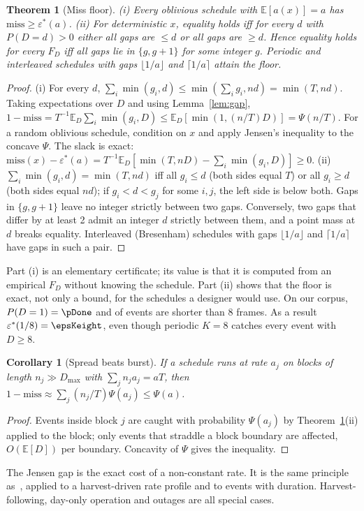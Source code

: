 \documentclass[final,5p,times,twocolumn]{elsarticle}
\newtheorem{theorem}{Theorem}
\newtheorem{corollary}{Corollary}
\theoremstyle{definition}
\theoremstyle{remark}
\newcommand{\eps}{\varepsilon}
\newcommand{\Psif}{\Psi}
\newcommand{\E}{\mathbb{E}}
\begin{document}
\begin{theorem}[Miss floor]\label{thm:floor}
(i) Every oblivious schedule with $\E[a(x)]=a$ has $\mathrm{miss}\ge\eps^*(a)$.
(ii) For deterministic $x$, equality holds iff for every $d$ with $P(D=d)>0$ either all gaps are $\le d$ or all gaps are $\ge d$. Hence equality holds for every $F_D$ iff all gaps lie in $\{g,g+1\}$ for some integer $g$. Periodic and interleaved schedules with gaps $\lfloor1/a\rfloor$ and $\lceil1/a\rceil$ attain the floor.
\end{theorem}
\begin{proof}
(i) For every $d$, $\sum_i\min(g_i,d)\le\min(\sum_ig_i,nd)=\min(T,nd)$. Taking expectations over $D$ and using Lemma~\ref{lem:gap}, $1-\mathrm{miss}=T^{-1}\E_D\sum_i\min(g_i,D)\le\E_D[\min(1,(n/T)D)]=\Psif(n/T)$. For a random oblivious schedule, condition on $x$ and apply Jensen's inequality to the concave $\Psif$. The slack is exact: $\mathrm{miss}(x)-\eps^*(a)=T^{-1}\E_D[\min(T,nD)-\sum_i\min(g_i,D)]\ge0$.
(ii) $\sum_i\min(g_i,d)=\min(T,nd)$ iff all $g_i\le d$ (both sides equal $T$) or all $g_i\ge d$ (both sides equal $nd$); if $g_i<d<g_j$ for some $i,j$, the left side is below both. Gaps in $\{g,g+1\}$ leave no integer strictly between two gaps. Conversely, two gaps that differ by at least 2 admit an integer $d$ strictly between them, and a point mass at $d$ breaks equality. Interleaved (Bresenham) schedules with gaps $\lfloor1/a\rfloor$ and $\lceil1/a\rceil$ have gaps in such a pair.
\end{proof}
\noindent Part (i) is an elementary certificate; its value is that it is computed from an empirical $F_D$ without knowing the schedule. Part (ii) shows that the floor is exact, not only a bound, for the schedules a designer would use. On our corpus, $P(D=1)=\pDone$ and \pDltEight{} of events are shorter than 8 frames. As a result $\eps^*(1/8)=\epsKeight$, even though periodic $K=8$ catches every event with $D\ge8$.

\begin{corollary}[Spread beats burst]\label{cor:jensen}
If a schedule runs at rate $a_j$ on blocks of length $n_j\gg D_{\max}$ with $\sum_jn_ja_j=aT$, then $1-\mathrm{miss}\approx\sum_j(n_j/T)\Psif(a_j)\le\Psif(a)$.
\end{corollary}
\begin{proof}
Events inside block $j$ are caught with probability $\Psif(a_j)$ by Theorem~\ref{thm:floor}(ii) applied to the block; only events that straddle a block boundary are affected, $O(\E[D])$ per boundary. Concavity of $\Psif$ gives the inequality.
\end{proof}
\noindent The Jensen gap is the exact cost of a non-constant rate. It is the same principle as~\cite[Thm.~1]{kar2006ton}, applied to a harvest-driven rate profile and to events with duration. Harvest-following, day-only operation and outages are all special cases.
\end{document}
